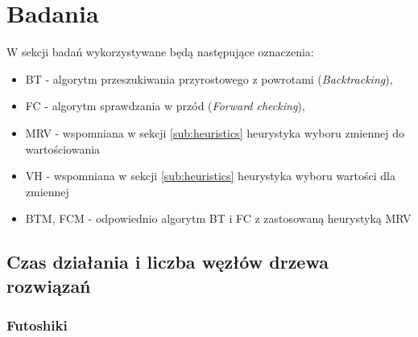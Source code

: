 \documentclass{article}
\begin{document}
	\section{Badania}
	W sekcji badań wykorzystywane będą następujące oznaczenia:
	\begin{itemize}
		\item BT - algorytm przeszukiwania przyrostowego z powrotami (\textit{Backtracking}),
		\item FC - algorytm sprawdzania w przód (\textit{Forward checking}),
		\item MRV - wspomniana w sekcji \ref{sub:heuristics} heurystyka wyboru zmiennej do wartościowania
		\item VH - wspomniana w sekcji \ref{sub:heuristics} heurystyka wyboru wartości dla zmiennej
		\item BTM, FCM - odpowiednio algorytm BT i FC z zastosowaną heurystyką MRV
	\end{itemize}
	\subsection{Czas działania i liczba węzłów drzewa rozwiązań}
	\subsubsection{Futoshiki}
	
\end{document}
